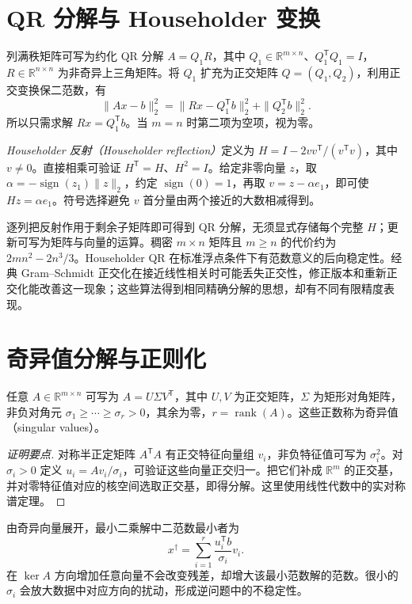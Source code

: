 \section{QR 分解与 Householder 变换}
列满秩矩阵可写为约化 QR 分解 $A=Q_1R$，其中 $Q_1\in\mathbb R^{m\times n}$、$Q_1^{\mathsf T}Q_1=I$，$R\in\mathbb R^{n\times n}$ 为非奇异上三角矩阵。将 $Q_1$ 扩充为正交矩阵 $Q=(Q_1,Q_2)$，利用正交变换保二范数，有
\[
 \|Ax-b\|_2^2=\|Rx-Q_1^{\mathsf T}b\|_2^2+\|Q_2^{\mathsf T}b\|_2^2.
\]
所以只需求解 $Rx=Q_1^{\mathsf T}b$。当 $m=n$ 时第二项为空项，视为零。

\emph{Householder 反射（Householder reflection）}定义为 $H=I-2vv^{\mathsf T}/(v^{\mathsf T}v)$，其中 $v\ne0$。直接相乘可验证 $H^{\mathsf T}=H$、$H^2=I$。给定非零向量 $z$，取 $\alpha=-\operatorname{sign}(z_1)\|z\|_2$，约定 $\operatorname{sign}(0)=1$，再取 $v=z-\alpha e_1$，即可使 $Hz=\alpha e_1$。符号选择避免 $v$ 首分量由两个接近的大数相减得到。

逐列把反射作用于剩余子矩阵即可得到 QR 分解，无须显式存储每个完整 $H$；更新可写为矩阵与向量的运算。稠密 $m\times n$ 矩阵且 $m\ge n$ 的代价约为 $2mn^2-2n^3/3$。Householder QR 在标准浮点条件下有范数意义的后向稳定性。经典 Gram--Schmidt 正交化在接近线性相关时可能丢失正交性，修正版本和重新正交化能改善这一现象；这些算法得到相同精确分解的思想，却有不同有限精度表现。

\section{奇异值分解与正则化}
\begin{theorem}[奇异值分解的基本形式]
任意 $A\in\mathbb R^{m\times n}$ 可写为 $A=U\Sigma V^{\mathsf T}$，其中 $U,V$ 为正交矩阵，$\Sigma$ 为矩形对角矩阵，非负对角元 $\sigma_1\ge\cdots\ge\sigma_r>0$，其余为零，$r=\operatorname{rank}(A)$。这些正数称为奇异值（singular values）。
\end{theorem}
\begin{proof}[证明要点]
对称半正定矩阵 $A^{\mathsf T}A$ 有正交特征向量组 $v_i$，非负特征值可写为 $\sigma_i^2$。对 $\sigma_i>0$ 定义 $u_i=Av_i/\sigma_i$，可验证这些向量正交归一。把它们补成 $\mathbb R^m$ 的正交基，并对零特征值对应的核空间选取正交基，即得分解。这里使用线性代数中的实对称谱定理。
\end{proof}

由奇异向量展开，最小二乘解中二范数最小者为
\[
 x^\dagger=\sum_{i=1}^r\frac{u_i^{\mathsf T}b}{\sigma_i}v_i.
\]
在 $\ker A$ 方向增加任意向量不会改变残差，却增大该最小范数解的范数。很小的 $\sigma_i$ 会放大数据中对应方向的扰动，形成逆问题中的不稳定性。

